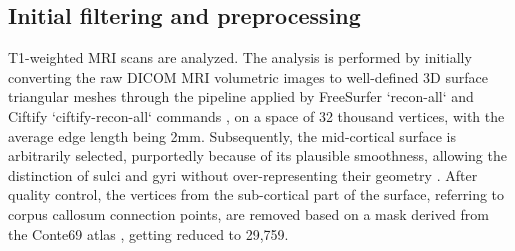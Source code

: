 \subsection{Initial filtering and preprocessing}
\label{subsec:pheno_preproc}
T1-weighted MRI scans are analyzed. The analysis is performed by initially converting the raw DICOM MRI volumetric images to well-defined 3D surface triangular meshes through the pipeline applied by FreeSurfer `recon-all` \cite{Reuter2012} and Ciftify `ciftify-recon-all` commands \cite{Dickie2019}, on a space of 32 thousand vertices, with the average edge length being 2mm. Subsequently, the mid-cortical surface is arbitrarily selected, purportedly because of its plausible smoothness, allowing the distinction of sulci and gyri without over-representing their geometry \cite{Naqvi2021}. After quality control,  the vertices from the sub-cortical part of the surface, referring to corpus callosum connection points, are removed based on a mask derived from the Conte69 atlas \cite{Glasser2011}, getting reduced to 29,759.


